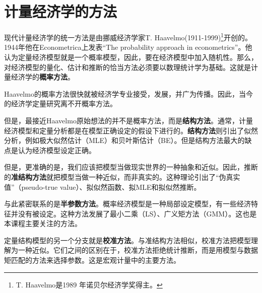 \documentclass[cn,10pt,math=newtx,citestyle=gb7714-2015,bibstyle=gb7714-2015]{elegantbook}
\begin{document}
	\section{计量经济学的方法}
	\begin{flushleft}
	
		现代计量经济学的统一方法是由挪威经济学家T. Haavelmo(1911-1999)\footnote{T. Haavelmo是1989 年诺贝尔经济学奖得主。}开创的。1944年他在Econometrica上发表“The probability approach in econometrics”。他认为定量经济模型就是一个概率模型，因此，要在经济模型中加入随机性。那么，对经济模型的量化、估计和推断的恰当方法必须要以数理统计学为基础。这就是计量经济学的\textbf{概率方法}。
		
		Haavelmo的概率方法很快就被经济学专业接受，发展，并广为传播。因此，当今的经济学定量研究离不开概率方法。
		
		但是，最接近Haavelmo原始想法的并不是概率方法，而是\textbf{结构方法}。通常，计量经济模型和定量分析都是在模型正确设定的假设下进行的。\textbf{结构方法}则引出了似然分析，例如极大似然估计（MLE）和贝叶斯估计（BE）。但是结构方法最大的缺点是认为经济模型设定正确。
		
		但是，更准确的是，我们应该把模型当做现实世界的一种抽象和近似。因此，推断的\textbf{准结构方法}就把模型当做一种近似，而非真实的。这种理论引出了“伪真实值”（pseudo-true value）、拟似然函数、拟MLE和拟似然推断。
		
		与此紧密联系的是\textbf{半参数方法}。概率经济模型是一种局部设定模型，有一些经济特征并没有被设定。这种方法发展了最小二乘（LS）、广义矩方法（GMM）。这也是本课程主要关注的方法。
		
		定量结构模型的另一个分支就是\textbf{校准方法}。与准结构方法相似，校准方法把模型理解为一种近似。它们之间的区别在于，校准方法拒绝统计推断，而是用模型与数据矩匹配的方法来选择参数。这是宏观计量中的主要方法。
	\end{flushleft}
\end{document}
